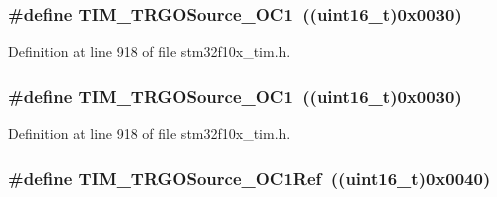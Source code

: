 \subsubsection[{\texorpdfstring{T\+I\+M\+\_\+\+T\+R\+G\+O\+Source\+\_\+\+O\+C1}{TIM_TRGOSource_OC1}}]{\setlength{\rightskip}{0pt plus 5cm}\#define T\+I\+M\+\_\+\+T\+R\+G\+O\+Source\+\_\+\+O\+C1~(({\bf uint16\+\_\+t})0x0030)}\hypertarget{group___t_i_m___trigger___output___source_ga2d044b472c021f5484b9f71eb9ca69f1}{}\label{group___t_i_m___trigger___output___source_ga2d044b472c021f5484b9f71eb9ca69f1}


Definition at line 918 of file stm32f10x\+\_\+tim.\+h.

\subsubsection[{\texorpdfstring{T\+I\+M\+\_\+\+T\+R\+G\+O\+Source\+\_\+\+O\+C1}{TIM_TRGOSource_OC1}}]{\setlength{\rightskip}{0pt plus 5cm}\#define T\+I\+M\+\_\+\+T\+R\+G\+O\+Source\+\_\+\+O\+C1~(({\bf uint16\+\_\+t})0x0030)}\hypertarget{group___t_i_m___trigger___output___source_ga2d044b472c021f5484b9f71eb9ca69f1}{}\label{group___t_i_m___trigger___output___source_ga2d044b472c021f5484b9f71eb9ca69f1}


Definition at line 918 of file stm32f10x\+\_\+tim.\+h.

\subsubsection[{\texorpdfstring{T\+I\+M\+\_\+\+T\+R\+G\+O\+Source\+\_\+\+O\+C1\+Ref}{TIM_TRGOSource_OC1Ref}}]{\setlength{\rightskip}{0pt plus 5cm}\#define T\+I\+M\+\_\+\+T\+R\+G\+O\+Source\+\_\+\+O\+C1\+Ref~(({\bf uint16\+\_\+t})0x0040)}\hypertarget{group___t_i_m___trigger___output___source_ga7cb70a2a026dc02136bdbb3dcc483d6c}{}\label{group___t_i_m___trigger___output___source_ga7cb70a2a026dc02136bdbb3dcc483d6c}


